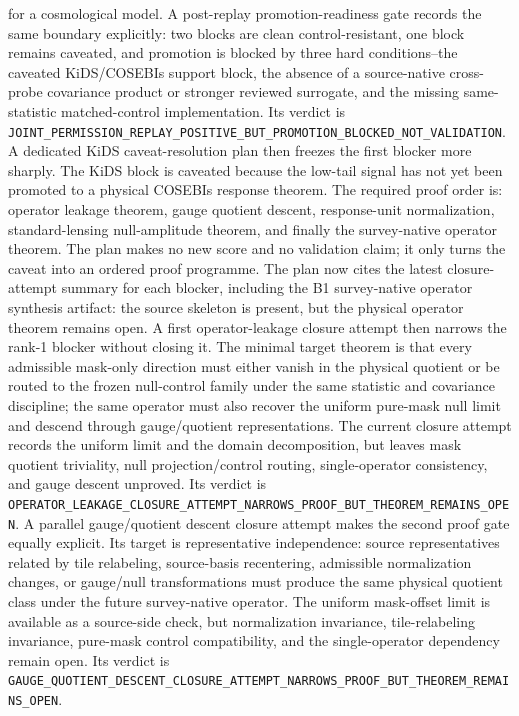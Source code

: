for a cosmological model.  A post-replay promotion-readiness gate records the
same boundary explicitly: two blocks are clean control-resistant, one block
remains caveated, and promotion is blocked by three hard conditions--the
caveated KiDS/COSEBIs support block, the absence of a source-native
cross-probe covariance product or stronger reviewed surrogate, and the missing
same-statistic matched-control implementation.  Its verdict is
\texttt{JOINT\_PERMISSION\_REPLAY\_POSITIVE\_BUT\_PROMOTION\_BLOCKED\_NOT\_VALIDATION}.
A dedicated KiDS caveat-resolution plan then freezes the first blocker more
sharply.  The KiDS block is caveated because the low-tail signal has not yet
been promoted to a physical COSEBIs response theorem.  The required proof order
is: operator leakage theorem, gauge quotient descent, response-unit
normalization, standard-lensing null-amplitude theorem, and finally the
survey-native operator theorem.  The plan makes no new score and no validation
claim; it only turns the caveat into an ordered proof programme.  The plan now
cites the latest closure-attempt summary for each blocker, including the B1
survey-native operator synthesis artifact: the source skeleton is present, but
the physical operator theorem remains open.
A first operator-leakage closure attempt then narrows the rank-1 blocker
without closing it.  The minimal target theorem is that every admissible
mask-only direction must either vanish in the physical quotient or be routed to
the frozen null-control family under the same statistic and covariance
discipline; the same operator must also recover the uniform pure-mask null
limit and descend through gauge/quotient representations.  The current closure
attempt records the uniform limit and the domain decomposition, but leaves mask
quotient triviality, null projection/control routing, single-operator
consistency, and gauge descent unproved.  Its verdict is
\texttt{OPERATOR\_LEAKAGE\_CLOSURE\_ATTEMPT\_NARROWS\_PROOF\_BUT\_THEOREM\_REMAINS\_OPEN}.
A parallel gauge/quotient descent closure attempt makes the second proof gate
equally explicit.  Its target is representative independence: source
representatives related by tile relabeling, source-basis recentering,
admissible normalization changes, or gauge/null transformations must produce
the same physical quotient class under the future survey-native operator.  The
uniform mask-offset limit is available as a source-side check, but
normalization invariance, tile-relabeling invariance, pure-mask control
compatibility, and the single-operator dependency remain open.  Its verdict is
\texttt{GAUGE\_QUOTIENT\_DESCENT\_CLOSURE\_ATTEMPT\_NARROWS\_PROOF\_BUT\_THEOREM\_REMAINS\_OPEN}.
